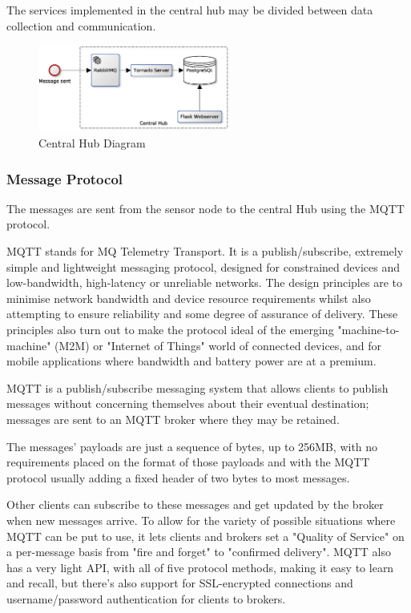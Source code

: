 \documentclass[letterpaper]{IEEEtran}
\begin{document}
The services implemented in the central hub may be divided between data collection and communication.

\begin{figure}[ht!]
\centering
\includegraphics[width=2.5in]{system_diagram}
\caption{Central Hub Diagram}
\label{central_hub_diagram}
\end{figure}


\subsubsection{Message Protocol}
The messages are sent from the sensor node to the central  Hub using the MQTT protocol.

MQTT stands for MQ Telemetry Transport. It is a publish/subscribe, extremely simple and lightweight messaging protocol, designed for constrained devices and low-bandwidth, high-latency or unreliable networks. The design principles are to minimise network bandwidth and device resource requirements whilst also attempting to ensure reliability and some degree of assurance of delivery. These principles also turn out to make the protocol ideal of the emerging "machine-to-machine" (M2M) or "Internet of Things" world of connected devices, and for mobile applications where bandwidth and battery power are at a premium\cite{mqtt}.

MQTT is a publish/subscribe messaging system that allows clients to publish messages without concerning themselves about their eventual destination; messages are sent to an MQTT broker where they may be retained.

The messages' payloads are just a sequence of bytes, up to 256MB, with no requirements placed on the format of those payloads and with the MQTT protocol usually adding a fixed header of two bytes to most messages.
 
Other clients can subscribe to these messages and get updated by the broker when new messages arrive. To allow for the variety of possible situations where MQTT can be put to use, it lets clients and brokers set a "Quality of Service" on a per-message basis from "fire and forget" to "confirmed delivery". MQTT also has a very light API, with all of five protocol methods, making it easy to learn and recall, but there's also support for SSL-encrypted connections and username/password authentication for clients to brokers.
\end{document}
